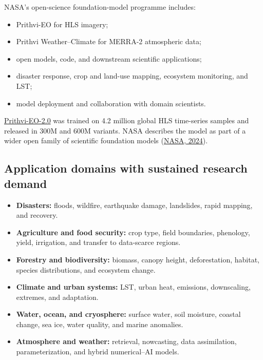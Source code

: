 \documentclass[
  a4paper,
  11pt]{article}
\providecommand{\tightlist}{%
  \setlength{\itemsep}{0pt}\setlength{\parskip}{0pt}}
\begin{document}
NASA's open-science foundation-model programme includes:

\begin{itemize}
\tightlist
\item
  Prithvi-EO for HLS imagery;
\item
  Prithvi Weather--Climate for MERRA-2 atmospheric data;
\item
  open models, code, and downstream scientific applications;
\item
  disaster response, crop and land-use mapping, ecosystem monitoring,
  and LST;
\item
  model deployment and collaboration with domain scientists.
\end{itemize}

\href{https://arxiv.org/abs/2412.02732}{Prithvi-EO-2.0} was trained on
4.2 million global HLS time-series samples and released in 300M and 600M
variants. NASA describes the model as part of a wider open family of
scientific foundation models
(\href{https://science.nasa.gov/science-research/ai-geospatial-model-earth/}{NASA,
2024}).

\hypertarget{application-domains-with-sustained-research-demand}{%
\subsection{Application domains with sustained research
demand}\label{application-domains-with-sustained-research-demand}}

\begin{itemize}
\tightlist
\item
  \textbf{Disasters:} floods, wildfire, earthquake damage, landslides,
  rapid mapping, and recovery.
\item
  \textbf{Agriculture and food security:} crop type, field boundaries,
  phenology, yield, irrigation, and transfer to data-scarce regions.
\item
  \textbf{Forestry and biodiversity:} biomass, canopy height,
  deforestation, habitat, species distributions, and ecosystem change.
\item
  \textbf{Climate and urban systems:} LST, urban heat, emissions,
  downscaling, extremes, and adaptation.
\item
  \textbf{Water, ocean, and cryosphere:} surface water, soil moisture,
  coastal change, sea ice, water quality, and marine anomalies.
\item
  \textbf{Atmosphere and weather:} retrieval, nowcasting, data
  assimilation, parameterization, and hybrid numerical--AI models.
\end{itemize}
\end{document}
